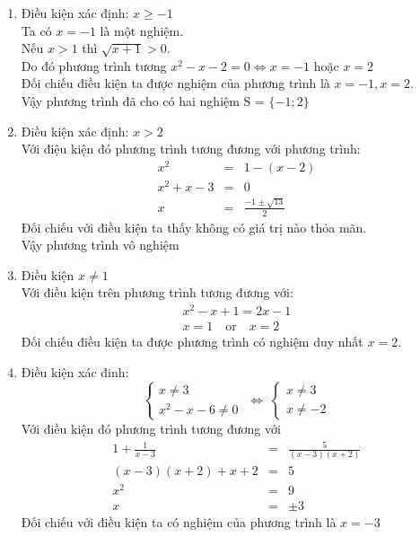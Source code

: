 \documentclass[13pt, a4paper, titlepage]{report}
\begin{document}
\begin{enumerate}[label=(\alph*)]
\item Điều kiện xác định: $x \geq -1$ \\
Ta có $x=-1$ là một nghiệm. \\
Nếu $x > 1$ thì $\sqrt{x+1} > 0$. \\
Do đó phương trình tương  $x^2 - x -2 = 0 \Leftrightarrow x=-1$ hoặc $x=2$ \\
Đối chiếu điều kiện ta được nghiệm của phương trình là $x = -1, x = 2$. \\
Vậy phương trình đã cho có hai nghiệm S = $\{-1; 2\}$

\item Điều kiện xác định: $x > 2$ \\
 Với điệu kiện đó phương trình tương đương với phương trình:
\begin{eqnarray*}
x^2 &=& 1 - (x-2) \\
x^2 + x -3 &=& 0 \\
x &=& \frac{-1 \pm \sqrt{13}}{2}
\end{eqnarray*}
Đối chiếu với điều kiện ta thấy không có giá trị nào thỏa mãn. \\
Vậy phương trình vô nghiệm

\item Điều kiện $x \neq 1$ \\
Với điều kiện trên phương trình tương đương với:\\
\begin{eqnarray*}
x^2 - x + 1 = 2x -1 \\
x = 1 \quad \textrm{or} \quad x = 2
\end{eqnarray*}
Đối chiếu điều kiện ta được phương trình có nghiệm duy nhất $x = 2$.

\item Điều kiện xác đinh:
\begin{displaymath}
\left\{ \begin{array}{l}
x \neq 3 \\
x^2 -x -6 \neq 0
\end{array} \right.  \; \Leftrightarrow \; \left\{ \begin{array}{l}
x \neq 3 \\
x \neq -2
\end{array} \right.
\end{displaymath}
Với điều kiện đó phương trình tương đương với\\
\begin{eqnarray*}
1 + \frac{1}{x-3} &=& \frac{5}{(x-3)(x+2)} \\
(x-3)(x+2) + x + 2 &=& 5 \\
x^2 &=& 9 \\
x &=& \pm 3
\end{eqnarray*}
Đối chiếu với điều kiện ta có nghiệm của phương trình là $x = -3$
\end{enumerate}
\end{document}
